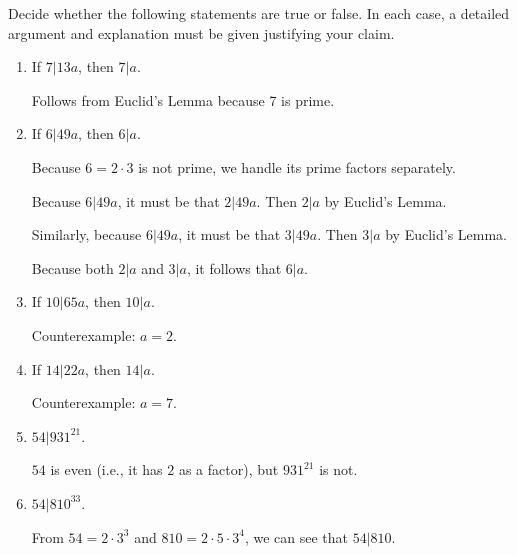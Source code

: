 \documentclass[nooutcomes]{ximera}
\begin{document}
\begin{problem}
Decide whether the following statements are true or false. In
  each case, a detailed argument and explanation must be given
  justifying your claim.
\begin{enumerate}
\item If $7|13a$, then $7|a$.  
  \begin{hint}Follows from Euclid's Lemma because 7 is prime.\end{hint}
\item If $6|49a$, then $6|a$.  
  \begin{hint}Because $6=2\cdot3$ is not prime, we handle its prime factors separately.  

  Because $6|49a$, it must be that $2|49a$.  Then $2|a$ by Euclid's Lemma. 
  
  Similarly, because $6|49a$, it must be that $3|49a$.  Then $3|a$ by Euclid's Lemma. 
  
  Because both $2|a$ and $3|a$, it follows that $6|a$.
  \end{hint}

\item If $10|65a$, then $10|a$. 
  \begin{hint}Counterexample: $a=2$.\end{hint}
\item If $14|22a$, then $14|a$.  
 \begin{hint}Counterexample: $a=7$.\end{hint}
\item $54|931^{21}$.  
 \begin{hint}$54$ is even (i.e., it has $2$ as a factor), but $931^{21}$ is not.\end{hint}
\item $54|810^{33}$.  
 \begin{hint}From $54 = 2\cdot3^3$ and $810 = 2\cdot 5\cdot 3^4$, 
 we can see that $54|810$.\end{hint}
\end{enumerate}
\end{problem}
\end{document}
